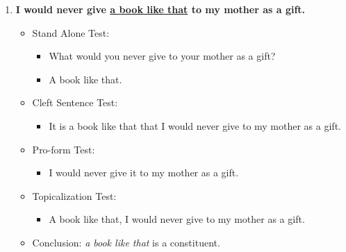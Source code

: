 \documentclass[12pt]{article}
\begin{document}
\begin{enumerate}
   \item \textbf{I would never give \underline{a book like that} to my mother as a gift.}
   \begin{itemize}
       \item Stand Alone Test:
       \begin{itemize}
           \item What would you never give to your mother as a gift?
           \item A book like that.
       \end{itemize}
       \item Cleft Sentence Test:
       \begin{itemize}
           \item It is a book like that that I would never give to my mother as a gift.
       \end{itemize}
       \item Pro-form Test:
       \begin{itemize}
           \item I would never give it to my mother as a gift. 
       \end{itemize}
       \item Topicalization Test:
       \begin{itemize}
           \item A book like that, I would never give to my mother as a gift.
       \end{itemize}
       \item Conclusion: \textit{a book like that} is a constituent.
   \end{itemize}
\end{enumerate}
\end{document}
